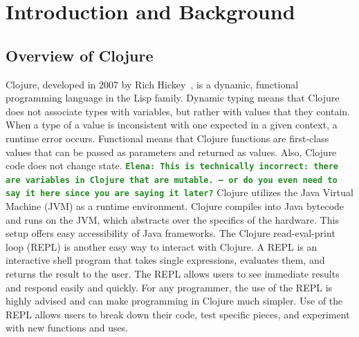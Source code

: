 \documentclass[12pt]{article}
\newcommand{\comment}[1]{{\bf \tt  {#1}}}
\newcommand{\emcomment}[1]{\textcolor{ForestGreen}{\comment{Elena: {#1}}}}
\newcommand{\hfcomment}[1]{\textcolor{Teal}{\comment{Henry: {#1}}}}
\begin{document}
\section{Introduction and Background}\label{sec:intro}
\subsection{Overview of Clojure}\label{sec:clojure}
  
  
Clojure, developed in 2007 by Rich Hickey~\cite{Hickey:2008}, is a dynamic, functional
programming language in the Lisp family. Dynamic typing means that Clojure does not 
associate types with
variables, but rather with values that they contain. When a type of a value is inconsistent with one expected in a given context, a runtime error occurs. 
Functional means
that Clojure functions are first-class values that can be passed as parameters and returned
as values. Also, Clojure code does not change state.
\emcomment{This is technically incorrect: there are variables in Clojure that are mutable. -- or do you even need to say it here since you are saying it later?}
Clojure utilizes the Java Virtual Machine (JVM) as a runtime environment. Clojure compiles into Java bytecode
and runs on the JVM, which abstracts over the specifics of the hardware.
This setup offers easy 
accessibility of Java frameworks. The Clojure read-eval-print loop (REPL)
is another easy way to interact 
 with Clojure. A REPL is an interactive shell program that takes single 
expressions, evaluates them, and returns the result to the user. The REPL allows users to see 
immediate results and respond easily and quickly. For any programmer, the use of the REPL 
is highly advised and can make programming in Clojure much simpler. Use of the REPL allows users
to break down their code, test specific pieces, and experiment with new functions and uses.
\end{document}
